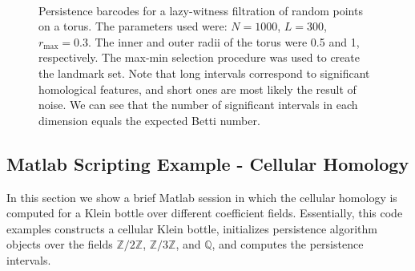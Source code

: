 \documentclass[10pt]{article}
\begin{document}
\begin{figure}
\centering
\mbox{
\quad
{}\quad
{}}
\caption{Persistence barcodes for a lazy-witness filtration of random points on a torus. The parameters used were: $N = 1000$, $L = 300$, $r_{\max} = 0.3$. The inner and outer radii of the torus were 0.5 and 1, respectively. The max-min selection procedure was used to create the landmark set. Note that long intervals correspond to significant homological features, and short ones are most likely the result of noise. We can see that the number of significant intervals in each dimension equals the expected Betti number.} \label{lwtorusbarcodes}
\end{figure}

\subsection{Matlab Scripting Example - Cellular Homology}

In this section we show a brief Matlab session in which the cellular homology is computed for a Klein bottle over different coefficient fields. Essentially, this code examples constructs a cellular Klein bottle, initializes persistence algorithm objects over the fields $\mathbb{Z}/2\mathbb{Z}$, $\mathbb{Z}/3\mathbb{Z}$, and $\mathbb{Q}$, and computes the persistence intervals.
\end{document}
